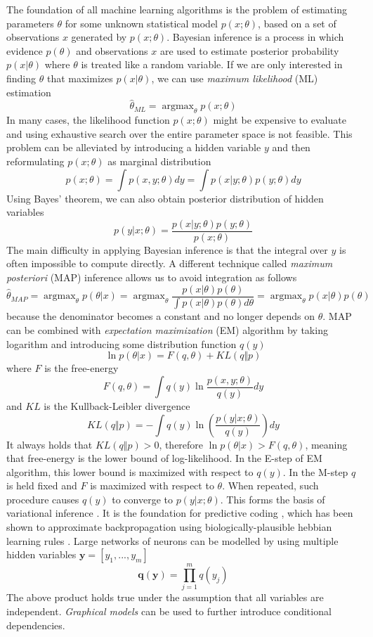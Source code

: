 \documentclass[12pt]{article}
\DeclareMathOperator*{\argmax}{argmax}
\begin{document}
The foundation of all machine learning algorithms is the problem of estimating parameters $\theta$ for some unknown statistical model $p(x;\theta)$, based on a set of observations $x$ generated by $p(x;\theta)$.  Bayesian inference \cite{var_inf} is a process in which evidence $p(\theta)$ and observations $x$ are used to estimate posterior probability $p(x|\theta)$ where $\theta$ is treated like a random variable.
If we are only interested in finding $\theta$ that maximizes $p(x|\theta)$,  we can use \textit{maximum likelihood} (ML) estimation
\[
\hat{\theta}_{ML} = \argmax_\theta p(x;\theta)
\]
In many cases, the likelihood function $p(x;\theta)$ might be expensive to evaluate and using exhaustive search over the entire parameter space is not feasible. This problem can be alleviated by introducing a hidden variable $y$ and then reformulating $p(x;\theta)$ as marginal distribution 
\[
p(x;\theta) = \int p(x, y;\theta) dy = \int p(x|y;\theta) p(y;\theta)  dy
\]
Using Bayes' theorem, we can also obtain posterior distribution of hidden variables
\[
p(y|x;\theta) = \frac{p(x|y;\theta)p(y;\theta)}{p(x;\theta)}
\]
The main difficulty in applying Bayesian inference is that the integral over $y$ is often impossible to compute directly. A different technique called \textit{maximum posteriori} (MAP) inference allows us to avoid integration as follows
\[
\hat{\theta}_{MAP} = \argmax_\theta p(\theta|x) = \argmax_\theta \frac{p(x|\theta)p(\theta)}{\int p(x|\theta)p(\theta) d\theta} = \argmax_\theta p(x|\theta)p(\theta)
\]
because the denominator becomes a constant and no longer depends on $\theta$.
MAP can be combined with \textit{expectation maximization} (EM) \cite{em_alg} algorithm by taking logarithm and introducing some distribution function $q(y)$
\[
\ln p(\theta | x) = F(q,\theta) + KL(q\Vert p) 
\]
where $F$ is the free-energy
\[
F(q,\theta) = \int q(y) \ln \frac{p(x,y;\theta)}{q(y)} dy
\]
and $KL$ is the Kullback-Leibler divergence
\[
KL(q\Vert p) = -\int  q(y)\ln(\frac{p(y|x;\theta)}{q(y)}) dy
\]
It always holds that $KL(q\Vert p) > 0$, therefore $\ln p(\theta | x) > F(q,\theta)$,  meaning that free-energy is the lower bound of  log-likelihood. 
In the E-step of EM algorithm, this lower  bound is maximized with respect to $q(y)$. In the M-step $q$ is held fixed and $F$ is maximized with respect to $\theta$.
When repeated, such procedure causes $q(y)$ to converge to $p(y|x;\theta)$. 
This forms the basis of variational inference \cite{var_inf}. It is the foundation for predictive coding \cite{pred_coding, free_energy_principle_and_brain}, which has been shown to approximate backpropagation using biologically-plausible hebbian learning rules \cite{pred_coding_comp_graph}. Large networks of neurons can be modelled by using multiple hidden variables  $\boldsymbol{y}=[y_1,...,y_m]$
\[
\boldsymbol{q}(\boldsymbol{y}) = \prod_{j=1}^{m} q(y_j)
\]
The above product holds true under the assumption that all variables are independent. \textit{Graphical models} can be used to further introduce conditional dependencies. 
\end{document}
